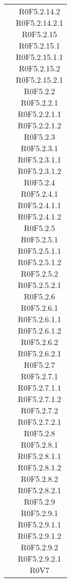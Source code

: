 \begin{center}
\begin{longtable}{|c|c|}
 & \parbox[t]{\larghezza}{  R0F5.2.14.2 \\ R0F5.2.14.2.1 \\ R0F5.2.15 \\ R0F5.2.15.1 \\ R0F5.2.15.1.1 \\ R0F5.2.15.2 \\ R0F5.2.15.2.1 \\ R0F5.2.2 \\ R0F5.2.2.1 \\ R0F5.2.2.1.1 \\ R0F5.2.2.1.2 \\ R0F5.2.3 \\ R0F5.2.3.1 \\ R0F5.2.3.1.1 \\ R0F5.2.3.1.2 \\ R0F5.2.4 \\ R0F5.2.4.1 \\ R0F5.2.4.1.1 \\ R0F5.2.4.1.2 \\ R0F5.2.5 \\ R0F5.2.5.1 \\ R0F5.2.5.1.1 \\ R0F5.2.5.1.2 \\ R0F5.2.5.2 \\ R0F5.2.5.2.1 \\ R0F5.2.6 \\ R0F5.2.6.1 \\ R0F5.2.6.1.1 \\ R0F5.2.6.1.2 \\ R0F5.2.6.2 \\ R0F5.2.6.2.1 \\ R0F5.2.7 \\ R0F5.2.7.1 \\ R0F5.2.7.1.1 \\ R0F5.2.7.1.2 \\ R0F5.2.7.2 \\ R0F5.2.7.2.1 \\ R0F5.2.8 \\ R0F5.2.8.1 \\ R0F5.2.8.1.1 \\ R0F5.2.8.1.2 \\ R0F5.2.8.2 \\ R0F5.2.8.2.1 \\ R0F5.2.9 \\ R0F5.2.9.1 \\ R0F5.2.9.1.1 \\ R0F5.2.9.1.2 \\ R0F5.2.9.2 \\ R0F5.2.9.2.1 \\ R0V7 \\} \\

\end{longtable}
\end{center}
